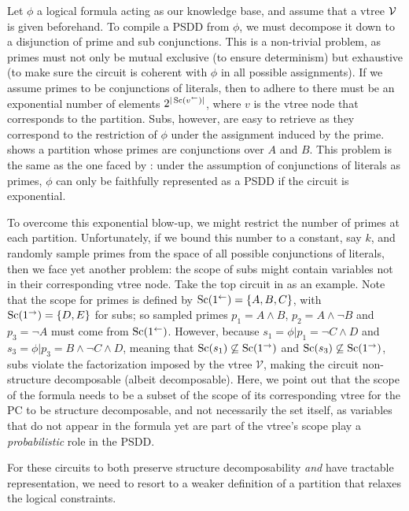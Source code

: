 Let $\phi$ a logical formula acting as our knowledge base, and assume that a vtree $\operatorname{\mathcal{V}}$ is
given beforehand. To compile a PSDD from $\phi$, we must decompose it down to a disjunction of
prime and sub conjunctions. This is a non-trivial problem, as primes must not only be mutual
exclusive (to ensure determinism) but exhaustive (to make sure the circuit is coherent with $\phi$
in all possible assignments). If we assume primes to be conjunctions of literals, then to adhere to
 there must be an exponential number of elements $2^{|\operatorname*{\normalfont{Sc}}(v^\gets)|}$, where
$v$ is the vtree node that corresponds to the partition. Subs, however, are easy to retrieve as
they correspond to the restriction of $\phi$ under the assignment induced by the prime.
 shows a partition whose primes are conjunctions over $A$ and $B$. This problem
is the same as the one faced by \citet{geh20}: under the assumption of conjunctions of literals as
primes, $\phi$ can only be faithfully represented as a PSDD if the circuit is exponential.

To overcome this exponential blow-up, we might restrict the number of primes at each partition.
Unfortunately, if we bound this number to a constant, say $k$, and randomly sample primes from the
space of all possible conjunctions of literals, then we face yet another problem: the scope of subs
might contain variables not in their corresponding vtree node. Take the top circuit in
 as an example. Note that the scope for primes is defined by
$\operatorname*{\normalfont{Sc}}(1^\gets)=\{A,B,C\}$, with $\operatorname*{\normalfont{Sc}}(1^\to)=\{D,E\}$ for subs; so sampled primes $p_1=A\wedge B$,
$p_2=A\wedge\neg B$ and $p_3=\neg A$ must come from $\operatorname*{\normalfont{Sc}}(1^\gets)$. However, because
$s_1=\phi|p_1=\neg C\wedge D$ and $s_3=\phi|p_3=B\wedge\neg C \wedge D$, meaning that
$\operatorname*{\normalfont{Sc}}(s_1)\not\subseteq\operatorname*{\normalfont{Sc}}(1^\to)$ and $\operatorname*{\normalfont{Sc}}(s_3)\not\subseteq\operatorname*{\normalfont{Sc}}(1^\to)$, subs violate the
factorization imposed by the vtree $\mathcal{V}$, making the circuit non-structure decomposable
(albeit decomposable). Here, we point out that the scope of the formula needs to be a subset of the
scope of its corresponding vtree for the PC to be structure decomposable, and not necessarily
the set itself, as variables that do not appear in the formula yet are part of the vtree's scope
play a \emph{probabilistic} role in the PSDD.

For these circuits to both preserve structure decomposability \emph{and} have tractable
representation, we need to resort to a weaker definition of a partition that relaxes the logical
constraints.

